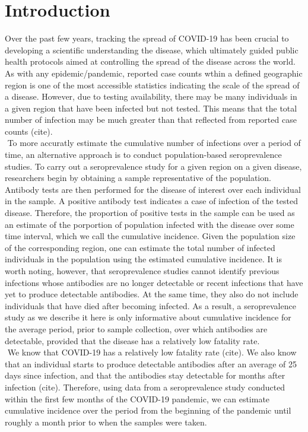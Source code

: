 \section{Introduction}
Over the past few years, tracking the spread of COVID-19 has been crucial to developing a scientific understanding the disease, which ultimately guided public health protocols aimed at controlling the spread of the disease across the world. As with any epidemic/pandemic, reported case counts wthin a defined geographic region is one of the most accessible statistics indicating the scale of the spread of a disease. However, due to testing availability, there may be many individuals in a given region that have been infected but not tested. This means that the total number of infection may be much greater than that reflected from reported case counts (cite).\\
\newline$ $
To more accuratly estimate the cumulative number of infections over a period of time, an alternative approach is to conduct population-based seroprevalence studies. To carry out a seroprevalence study for a given region on a given disease, researchers begin by obtaining a sample representative of the population. Antibody tests are then performed for the disease of interest over each individual in the sample. A positive antibody test indicates a case of infection of the tested disease. Therefore, the proportion of positive tests in the sample can be used as an estimate of the porportion of population infected with the disease over some time interval, which we call the cumulative incidence. Given the population size of the corresponding region, one can estimate the total number of infected individuals in the population using the estimated cumulative incidence. It is worth noting, however, that seroprevalence studies cannot identify previous infections whose antibodies are no longer detectable or recent infections that have yet to produce detectable antibodies. At the same time, they also do not include individuals that have died after becoming infected. As a result, a seroprevalence study as we describe it here is only informative about cumulative incidence for the average period, prior to sample collection, over which antibodies are detectable, provided that the disease has a relatively low fatality rate.\\
\newline$ $
We know that COVID-19 has a relatively low fatality rate (cite). We also know that an individual starts to produce detectable antibodies after an average of 25 days since infection, and that the antibodies stay detectable for months after infection (cite). Therefore, using data from a seroprevalence study conducted within the first few months of the COVID-19 pandemic, we can estimate cumulative incidence over the period from the beginning of the pandemic until roughly a month prior to when the samples were taken.
